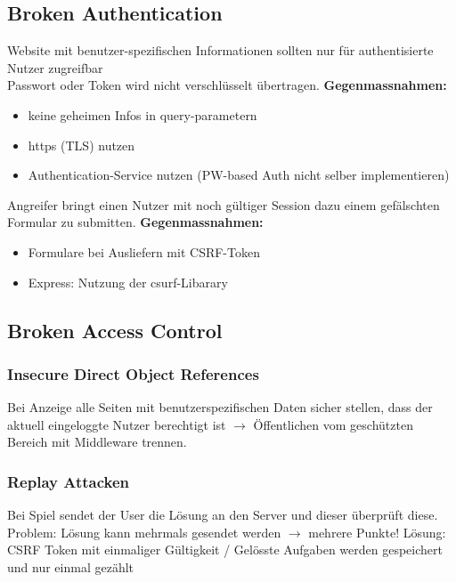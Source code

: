 \subsection{Broken Authentication}
Website mit benutzer-spezifischen Informationen sollten nur für authentisierte Nutzer zugreifbar\\
Passwort oder Token wird nicht verschlüsselt übertragen.
\textbf{Gegenmassnahmen:}
\begin{itemize}
    \item keine geheimen Infos in query-parametern
    \item https (TLS) nutzen
    \item Authentication-Service nutzen (PW-based Auth nicht selber implementieren)
\end{itemize}
Angreifer bringt einen Nutzer mit noch gültiger Session dazu einem gefälschten Formular zu submitten. \textbf{Gegenmassnahmen:}
\begin{itemize}
    \item Formulare bei Ausliefern mit CSRF-Token
    \item Express: Nutzung der csurf-Libarary
\end{itemize}


\subsection{Broken Access Control}

\subsubsection{Insecure Direct Object References}
Bei Anzeige alle Seiten mit benutzerspezifischen Daten sicher stellen,
dass der aktuell eingeloggte Nutzer berechtigt ist $\rightarrow$ Öffentlichen vom geschützten Bereich mit Middleware trennen.

\subsubsection{Replay Attacken}
Bei Spiel sendet der User die Lösung an den Server und dieser überprüft diese.
Problem: Lösung kann mehrmals gesendet werden $\rightarrow$ mehrere Punkte!
Lösung: CSRF Token mit einmaliger Gültigkeit / Gelösste Aufgaben werden gespeichert und nur einmal gezählt


\vfill